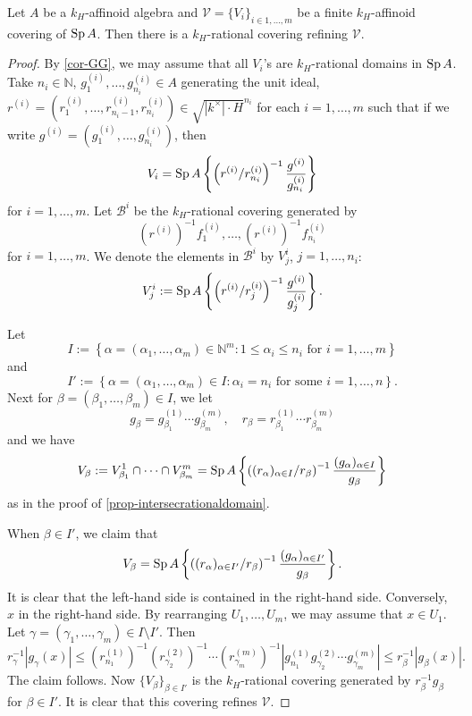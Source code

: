 \begin{lemma}\label{lma-prooftatelma1}
    Let $A$ be a $k_H$-affinoid algebra and $\mathcal{V}=\{V_i\}_{i\in 1,\ldots,m}$ be a finite $k_H$-affinoid covering of $\operatorname{Sp} A$. Then there is a $k_H$-rational covering refining $\mathcal{V}$.
\end{lemma}
\begin{proof}
    By \cref{cor-GG}, we may assume that all $V_i$'s are $k_H$-rational domains in $\operatorname{Sp} A$. Take $n_i\in \mathbb{N}$, $g^{(i)}_1,\ldots,g^{(i)}_{n_i}\in A$ generating the unit ideal, $r^{(i)}=(r^{(i)}_1,\ldots,r^{(i)}_{n_i-1},r^{(i)}_{n_i})\in \sqrt{|k^{\times}|\cdot H}^{n_i}$ for each $i=1,\ldots,m$
    such that if we write $g^{(i)}=(g^{(i)}_1,\ldots,g^{(i)}_{n_i})$, then
    \[
        V_i=\operatorname{Sp} A\left\{ \left(r^{(i)}/r^{(i)}_{n_i}\right)^{-1} \frac{g^{(i)}}{g^{(i)}_{n_i}} \right\}  
    \]
    for $i=1,\ldots,m$. Let $\mathcal{B}^i$ be the $k_H$-rational covering generated by 
    \[
        (r^{(i)})^{-1}f^{(i)}_1,\ldots,(r^{(i)})^{-1}f^{(i)}_{n_i}
    \]    
    for $i=1,\ldots,m$. 
    We denote the elements in $\mathcal{B}^i$ by $V^i_j$, $j=1,\ldots,n_i$:
    \[
        V^i_j:=\operatorname{Sp} A\left\{ \left(r^{(i)}/r^{(i)}_{j}\right)^{-1} \frac{g^{(i)}}{g^{(i)}_{j}}\right\}.  
    \]

    Let 
    \[
        I:=\left\{\alpha=(\alpha_1,\ldots,\alpha_m)\in \mathbb{N}^m: 1\leq \alpha_i\leq n_i\text{ for }i=1,\ldots,m \right\}  
    \]
    and 
    \[
        I':=\left\{\alpha=(\alpha_1,\ldots,\alpha_m)\in I: \alpha_i=n_i\text{ for some }i=1,\ldots,n\right\}.  
    \]
    Next for $\beta=(\beta_1,\ldots,\beta_m)\in I$, we let 
    \[
        g_{\beta}=g^{(1)}_{\beta_1}\cdots g^{(m)}_{\beta_m},\quad r_{\beta}=r^{(1)}_{\beta_1}\cdots r^{(m)}_{\beta_m}
    \]
    and we have
    \[
        V_{\beta}:=V^1_{\beta_1}\cap\cdots\cap V^m_{\beta_m}=\operatorname{Sp} A\left\{ \left((r_{\alpha})_{\alpha\in I}/r_{\beta} \right)^{-1} \frac{(g_{\alpha})_{\alpha\in I}}{g_{\beta}}\right\}  
    \]
    as in the proof of \cref{prop-intersecrationaldomain}.

    When $\beta\in I'$, we claim that
    \[
        V_{\beta}=\operatorname{Sp} A\left\{ \left((r_{\alpha})_{\alpha\in I'}/r_{\beta} \right)^{-1} \frac{(g_{\alpha})_{\alpha\in I'}}{g_{\beta}}\right\}.
    \]
    It is clear that the left-hand side is contained in the right-hand side. Conversely, $x$ in the right-hand side. By rearranging $U_1,\ldots,U_m$, we may assume that $x\in U_1$. Let $\gamma=(\gamma_1,\ldots,\gamma_m)\in I\setminus I'$. Then
    \[
        r_{\gamma}^{-1}\left|g_{\gamma}(x)\right|\leq (r^{(1)}_{n_1})^{-1}(r^{(2)}_{\gamma_2})^{-1}\cdots (r^{(m)}_{\gamma_m})^{-1}\left|g^{(1)}_{n_1}g^{(2)}_{\gamma_2}\cdots g^{(m)}_{\gamma_m}\right|\leq r_{\beta}^{-1}|g_{\beta}(x)|.  
    \]
    The claim follows. Now $\{V_{\beta}\}_{\beta\in I'}$ is the $k_H$-rational covering generated by $r_{\beta}^{-1}g_{\beta}$ for $\beta\in I'$. It is clear that this covering refines $\mathcal{V}$.
\end{proof}

